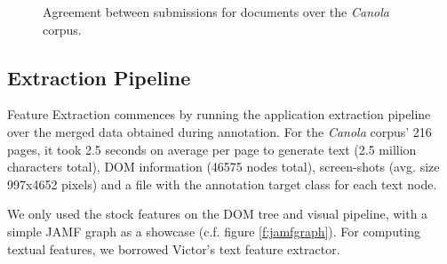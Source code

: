 \begin{figure}[h]
\centering
{}
\caption{
\label{f:merge}
\label{ens2}
	Agreement between submissions for documents over the \textit{Canola} corpus.}
\end{figure}


\subsection{Extraction Pipeline}

Feature Extraction commences by running the {\KrdWrd} application extraction pipeline over the merged data obtained during annotation. 
For the \textit{Canola} corpus' 216 pages, it took 2.5 seconds on average per page to generate text (2.5 million characters total), DOM information (46575 nodes total), screen-shots (avg. size 997x4652 pixels) and a file with the annotation target class for each text node.

We only used the stock {\KrdWrd} features on the DOM tree and visual pipeline, with a simple JAMF graph as a showcase (c.f. figure \ref{f:jamfgraph}).
For computing textual features, we borrowed Victor's \cite{spoustamarekpecina2008} text feature extractor.

